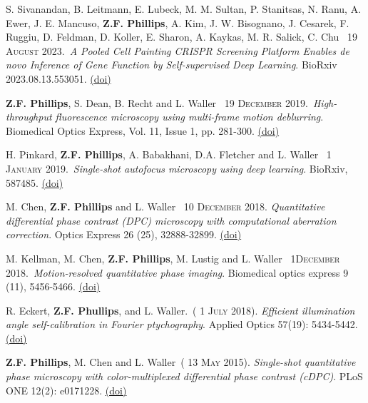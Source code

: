 \documentclass[12pt,letterpaper]{article}
\newcommand{\mhead}[1]{\leavevmode\marginpar{\sffamily\footnotesize #1}}
\renewcommand{\date}[1]{{} #1}
\begin{document}
\newpage
\mhead{Publications}%
\par\vspace{-\baselineskip}

\medskip
S. Sivanandan, B. Leitmann, E. Lubeck, M. M. Sultan, P. Stanitsas, N. Ranu, A. Ewer, J. E. Mancuso, \textbf{Z.F. Phillips}, A. Kim, J. W. Bisognano, J. Cesarek, F. Ruggiu, D. Feldman,  D. Koller,  E. Sharon,  A. Kaykas,  M. R. Salick,  C. Chu~\date{19 \textsc{August} 2023}.~\emph{A Pooled Cell Painting CRISPR Screening Platform Enables de novo Inference of Gene Function by Self-supervised Deep Learning}. BioRxiv 2023.08.13.553051. \href{https://doi.org/10.1101/2023.08.13.553051}{(doi)}

\medskip
\textbf{Z.F. Phillips}, S. Dean, B. Recht and L. Waller~\date{19 \textsc{December} 2019}.~\emph{High-throughput fluorescence microscopy using multi-frame motion deblurring}. Biomedical Optics Express,  Vol. 11, Issue 1, pp. 281-300. \href{https://doi.org/10.1364/BOE.11.000281}{(doi)}

\medskip
H. Pinkard, \textbf{Z.F. Phillips}, A. Babakhani, D.A. Fletcher and L. Waller~\date{1 \textsc{January} 2019}.~\emph{Single-shot autofocus microscopy using deep learning}. BioRxiv, 587485. \href{https://doi.org/10.1101/587485}{(doi)}

\medskip
M. Chen, \textbf{Z.F. Phillips} and L. Waller~\date{10 \textsc{December} 2018}. \emph{Quantitative differential phase contrast (DPC) microscopy with computational aberration correction}. Optics Express 26 (25), 32888-32899. \href{https://doi.org/10.1364/OE.26.032888}{(doi)}

\medskip
M. Kellman, M. Chen, \textbf{Z.F. Phillips}, M. Lustig and L. Waller~\date{1\textsc{December} 2018}.~\emph{Motion-resolved quantitative phase imaging}. Biomedical optics express 9 (11), 5456-5466. \href{https://doi.org/10.1364/BOE.9.005456}{(doi)}

\medskip
R. Eckert, \textbf{Z.F. Phullips}, and L. Waller.~(\date{1 \textsc{July} 2018}).
\emph{Efficient illumination angle self-calibration in Fourier ptychography}.
Applied Optics 57(19): 5434-5442. \href{https://doi.org/10.1364/AO.57.005434}{(doi)}

\medskip
\textbf{Z.F. Phillips}, M. Chen and L. Waller~(\date{13 \textsc{May} 2015}).
\emph{Single-shot quantitative phase microscopy with color-multiplexed differential phase contrast (cDPC)}.
PLoS ONE 12(2): e0171228. \href{http://journals.plos.org/plosone/article?id=10.1371/journal.pone.0171228}{(doi)}
\end{document}
